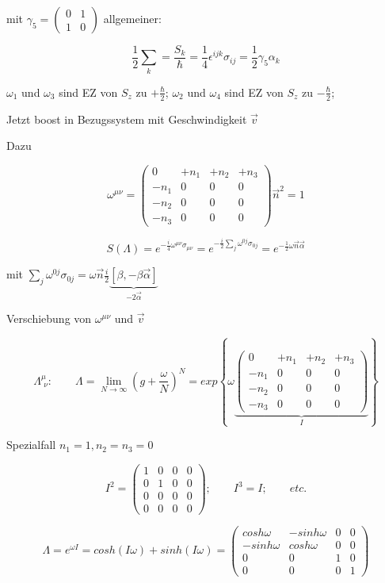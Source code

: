 mit \(\gamma_5 = \begin{pmatrix} 0&1\\   1&0 \end{pmatrix} \) allgemeiner:

\[\frac{1}{2}\sum_k = \frac{S_k}{\hbar} = \frac{1}{4} \epsilon^{ijk}\sigma_{ij} = \frac{1}{2} \gamma_5\alpha_k\]

\(\omega_1\) und \(\omega_3\) sind EZ von \(S_z\) zu \(+\frac{\hbar}{2}\); \(\omega_2\) und \(\omega_4\) sind EZ von \(S_z\) zu \(-\frac{\hbar}{2}\);

Jetzt boost in Bezugssystem mit Geschwindigkeit \(\vec v\)

Dazu

\[\omega^{\mu\nu}   =\begin{pmatrix} 0&+n_1&+n_2&+n_3\\  -n_1&0&0&0\\   -n_2&0&0&0\\  -n_3&0&0&0 \end{pmatrix}\vec n^2 = 1 \]

\[ S(\Lambda) = e^{-\frac{i}{4}\omega^{\mu\nu}\sigma_{\mu\nu}}  = e^{-\frac{i}{2}\sum_j\omega^{0j}\sigma_{0j}} = e^{-\frac{1}{2}\omega \vec n\vec \alpha}  \]

mit \( \sum_j\omega^{0j}\sigma_{0j} = \omega \vec n \frac{i}{2}\underbrace{[\beta,-\beta\vec\alpha]}_{-2\vec\alpha} \)

Verschiebung von \(\omega^{\mu\nu}\) und \(\vec v\)


\[\Lambda^\mu_{\,\,\nu}: \qquad \Lambda = \lim_{N \to \infty} (g+\frac{\omega}{N})^N = exp\left\{\omega\underbrace{ \begin{pmatrix} 0&+n_1&+n_2&+n_3\\  -n_1&0&0&0\\   -n_2&0&0&0\\  -n_3&0&0&0 \end{pmatrix}}_{I}  \right\}\]

Spezialfall \(n_1 = 1, n_2=n_3 = 0\)

\[I^2 = \begin{pmatrix} 1&0&0&0\\ 0&1&0&0 \\ 0&0&0&0\\ 0&0&0&0 \end{pmatrix};\qquad I^3=I;\qquad etc. \]

\[\Lambda = e^{\omega I} = cosh(I\omega) + sinh(I\omega) =  \begin{pmatrix} cosh\omega&-sinh\omega&0&0\\ -sinh\omega&cosh\omega&0&0 \\ 0&0&1&0\\ 0&0&0&1 \end{pmatrix} \]


